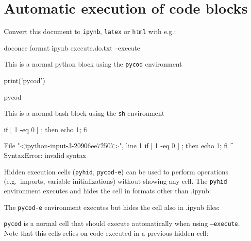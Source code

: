 \documentclass[%
oneside,                 %
final,                   %
chapterprefix=true,      %
open=right,              %
10pt]{book}
\begin{document}

\newcommand{\exercisesection}[1]{\subsection*{#1}}





\chapter{Automatic execution of code blocks}

Convert this document to \texttt{ipynb}, \texttt{latex} or \texttt{html} with e.g.:



\bsh
doconce format ipynb execute.do.txt --execute

\esh


This is a normal python block using the \texttt{pycod} environment


\bpycod
print('pycod')

\epycod

\bpyout
pycod
\epyout

This is a normal bash block using the \texttt{sh} environment


\bsh
if [ 1 -eq 0 ] ; then echo 1; fi

\esh

\bpyout
  File "<ipython-input-3-20906ee72507>", line 1
    if [ 1 -eq 0 ] ; then echo 1; fi
               ^
SyntaxError: invalid syntax
\epyout

Hidden execution cells (\texttt{pyhid}, \texttt{pycod-e}) can be used to perform operations (e.g.~imports, variable initializations) without showing any cell.  
The \texttt{pyhid} environment executes and hides the cell in formats other than .ipynb:







The \texttt{pycod-e} environment executes but hides the cell also in .ipynb files:







\texttt{pycod} is a normal cell that should execute automatically when using \texttt{--execute}. Note that this cells relies on code executed in a previous hidden cell:
\end{document}
